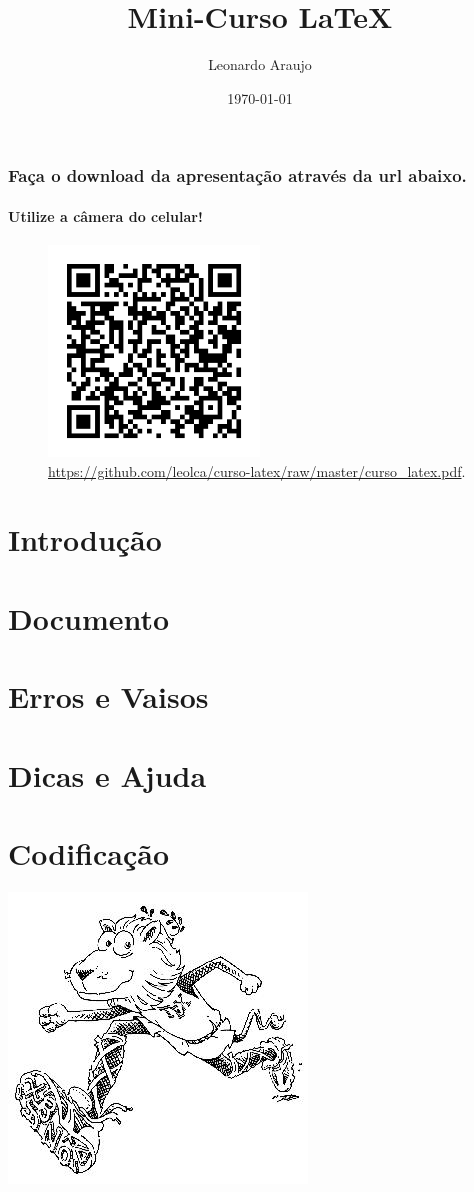 \documentclass[xcolor={table}]{beamer}
\title[Mini-Curso \LaTeX{}]{Mini-Curso \LaTeX{}}
\author{Leonardo Araujo}
\date{\today}
\institute{UFSJ}
\begin{document}
\begin{frame}[plain]
\maketitle
\end{frame}


\begin{frame}
\frametitle{Faça o download da apresentação através da url abaixo.}
\framesubtitle{Utilize a câmera do celular!}
  \begin{figure}[h!]
  \centering
  \includegraphics[width=0.5\textwidth]{figures/qr_img.png}
  \caption{\url{https://github.com/leolca/curso-latex/raw/master/curso_latex.pdf}.}
  \label{fig:qrcode}
  \end{figure}
\end{frame}

\section{Introdução}\label{sec:intro}


\section{Documento}\label{sec:doc}


\section{Erros e Vaisos}\label{sec:errors}


\section{Dicas e Ajuda}\label{sec:ajuda}


\section{Codificação}\label{sec:digitalcoding}




\label{bibliografia}
\nocite{*}

\vspace{5em}
\begin{flushright}
\includegraphics[width=0.3\linewidth]{figures/lion04.png}
\end{flushright}
\end{document}

